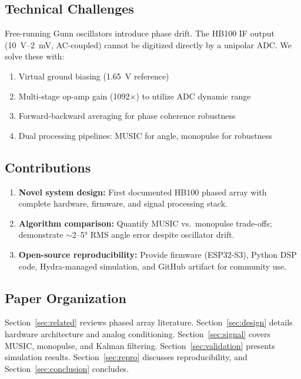 \documentclass[10pt,a4paper]{article}
\begin{document}
\subsection{Technical Challenges}

Free-running Gunn oscillators introduce phase drift. The HB100 IF output (10~\textmu V--2~mV,
AC-coupled) cannot be digitized directly by a unipolar ADC. We solve these with:

\begin{enumerate}
\item Virtual ground biasing (1.65~V reference)
\item Multi-stage op-amp gain (1092$\times$) to utilize ADC dynamic range
\item Forward-backward averaging for phase coherence robustness
\item Dual processing pipelines: MUSIC for angle, monopulse for robustness
\end{enumerate}

\subsection{Contributions}

\begin{enumerate}
\item \textbf{Novel system design:} First documented HB100 phased array with complete
  hardware, firmware, and signal processing stack.
\item \textbf{Algorithm comparison:} Quantify MUSIC vs.\ monopulse trade-offs; demonstrate
  $\sim$2--5° RMS angle error despite oscillator drift.
\item \textbf{Open-source reproducibility:} Provide firmware (ESP32-S3), Python DSP code,
  Hydra-managed simulation, and GitHub artifact for community use.
\end{enumerate}

\subsection{Paper Organization}

Section~\ref{sec:related} reviews phased array literature. Section~\ref{sec:design} details
hardware architecture and analog conditioning. Section~\ref{sec:signal} covers MUSIC, monopulse,
and Kalman filtering. Section~\ref{sec:validation} presents simulation results.
Section~\ref{sec:repro} discusses reproducibility, and Section~\ref{sec:conclusion} concludes.
\end{document}

